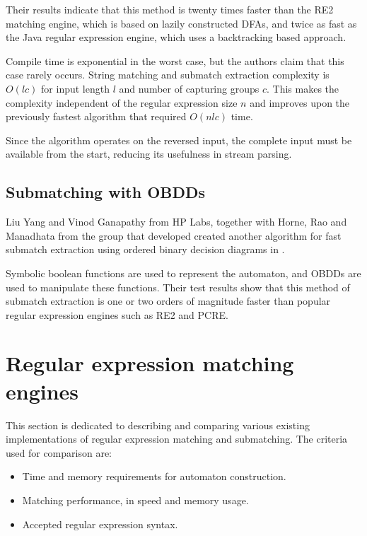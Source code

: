 Their results indicate that this method is twenty times faster than the RE2
matching engine, which is based on lazily constructed DFAs, and twice as fast as
the Java regular expression engine, which uses a backtracking based approach.

Compile time is exponential in the worst case, but the authors claim that this
case rarely occurs. String matching and submatch extraction complexity is
$O(lc)$ for input length $l$ and number of capturing groups $c$. This makes the
complexity independent of the regular expression size $n$ and improves upon the
previously fastest algorithm that required $O(nlc)$ time.

Since the algorithm operates on the reversed input, the complete input must be
available from the start, reducing its usefulness in stream parsing.


\subsection{Submatching with OBDDs}

Liu Yang and Vinod Ganapathy from HP Labs, together with Horne, Rao and
Manadhata from the group that developed \cite{bidi-re} created another algorithm
for fast submatch extraction using ordered binary decision diagrams in
\cite{obdd-re}.

Symbolic boolean functions are used to represent the automaton, and OBDDs are
used to manipulate these functions. Their test results show that this method of
submatch extraction is one or two orders of magnitude faster than popular
regular expression engines such as RE2 and PCRE.


\section{Regular expression matching engines}

This section is dedicated to describing and comparing various existing
implementations of regular expression matching and submatching. The criteria
used for comparison are:

\begin{itemize}
   \item Time and memory requirements for automaton construction.
   \item Matching performance, in speed and memory usage.
   \item Accepted regular expression syntax.
\end{itemize}


